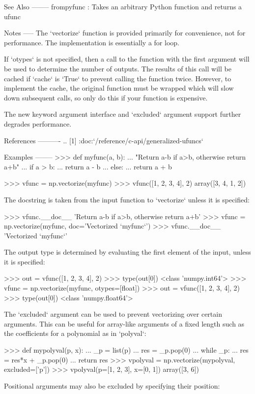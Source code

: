 \begin{DoxyVerb}
See Also
--------
frompyfunc : Takes an arbitrary Python function and returns a ufunc

Notes
-----
The `vectorize` function is provided primarily for convenience, not for
performance. The implementation is essentially a for loop.

If `otypes` is not specified, then a call to the function with the
first argument will be used to determine the number of outputs.  The
results of this call will be cached if `cache` is `True` to prevent
calling the function twice.  However, to implement the cache, the
original function must be wrapped which will slow down subsequent
calls, so only do this if your function is expensive.

The new keyword argument interface and `excluded` argument support
further degrades performance.

References
----------
.. [1] :doc:`/reference/c-api/generalized-ufuncs`

Examples
--------
>>> def myfunc(a, b):
...     "Return a-b if a>b, otherwise return a+b"
...     if a > b:
...         return a - b
...     else:
...         return a + b

>>> vfunc = np.vectorize(myfunc)
>>> vfunc([1, 2, 3, 4], 2)
array([3, 4, 1, 2])

The docstring is taken from the input function to `vectorize` unless it
is specified:

>>> vfunc.__doc__
'Return a-b if a>b, otherwise return a+b'
>>> vfunc = np.vectorize(myfunc, doc='Vectorized `myfunc`')
>>> vfunc.__doc__
'Vectorized `myfunc`'

The output type is determined by evaluating the first element of the input,
unless it is specified:

>>> out = vfunc([1, 2, 3, 4], 2)
>>> type(out[0])
<class 'numpy.int64'>
>>> vfunc = np.vectorize(myfunc, otypes=[float])
>>> out = vfunc([1, 2, 3, 4], 2)
>>> type(out[0])
<class 'numpy.float64'>

The `excluded` argument can be used to prevent vectorizing over certain
arguments.  This can be useful for array-like arguments of a fixed length
such as the coefficients for a polynomial as in `polyval`:

>>> def mypolyval(p, x):
...     _p = list(p)
...     res = _p.pop(0)
...     while _p:
...         res = res*x + _p.pop(0)
...     return res
>>> vpolyval = np.vectorize(mypolyval, excluded=['p'])
>>> vpolyval(p=[1, 2, 3], x=[0, 1])
array([3, 6])

Positional arguments may also be excluded by specifying their position:


\end{DoxyVerb}

